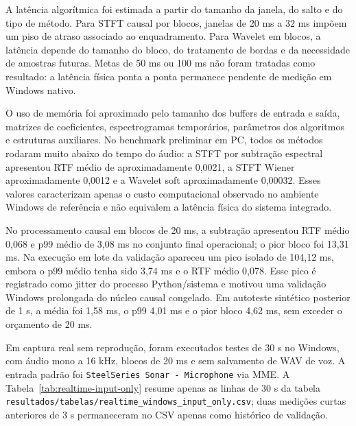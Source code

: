 A latência algorítmica foi estimada a partir do tamanho da janela, do salto e do tipo de método. Para STFT causal por blocos, janelas de 20 ms a 32 ms impõem um piso de atraso associado ao enquadramento. Para Wavelet em blocos, a latência depende do tamanho do bloco, do tratamento de bordas e da necessidade de amostras futuras. Metas de 50 ms ou 100 ms não foram tratadas como resultado: a latência física ponta a ponta permanece pendente de medição em Windows nativo.

O uso de memória foi aproximado pelo tamanho dos buffers de entrada e saída, matrizes de coeficientes, espectrogramas temporários, parâmetros dos algoritmos e estruturas auxiliares. No benchmark preliminar em PC, todos os métodos rodaram muito abaixo do tempo do áudio: a STFT por subtração espectral apresentou RTF médio de aproximadamente 0,0021, a STFT Wiener aproximadamente 0,0012 e a Wavelet soft aproximadamente 0,00032. Esses valores caracterizam apenas o custo computacional observado no ambiente Windows de referência e não equivalem a latência física do sistema integrado.

No processamento causal em blocos de 20 ms, a subtração apresentou RTF médio 0,068 e p99 médio de 3,08 ms no conjunto final operacional; o pior bloco foi 13,31 ms. Na execução em lote da validação apareceu um pico isolado de 104,12 ms, embora o p99 médio tenha sido 3,74 ms e o RTF médio 0,078. Esse pico é registrado como jitter do processo Python/sistema e motivou uma validação Windows prolongada do núcleo causal congelado. Em autoteste sintético posterior de 1 s, a média foi 1,58 ms, o p99 4,01 ms e o pior bloco 4,62 ms, sem exceder o orçamento de 20 ms.

Em captura real sem reprodução, foram executados testes de 30 s no Windows, com áudio mono a 16 kHz, blocos de 20 ms e sem salvamento de WAV de voz. A entrada padrão foi \texttt{SteelSeries Sonar - Microphone} via MME. A Tabela~\ref{tab:realtime-input-only} resume apenas as linhas de 30 s da tabela \texttt{resultados/tabelas/realtime\_windows\_input\_only.csv}; duas medições curtas anteriores de 3 s permaneceram no CSV apenas como histórico de validação.

